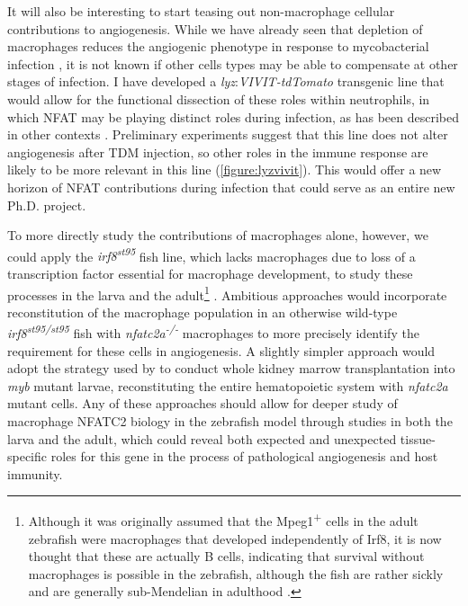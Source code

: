 It will also be interesting to start teasing out non\hyp{}macrophage cellular contributions to angiogenesis. While we have already seen that depletion of macrophages reduces the angiogenic phenotype in response to mycobacterial infection \citep{Oehlers2015}, it is not known if other cells types may be able to compensate at other stages of infection. I have developed a \textit{lyz}:\textit{VIVIT\hyp{}tdTomato} transgenic line that would allow for the functional dissection of these roles within neutrophils, in which NFAT may be playing distinct roles during infection, as has been described in other contexts \citep{Herbst2015, Vymazal2021, Vega2007}. Preliminary experiments suggest that this line does not alter angiogenesis after TDM injection, so other roles in the immune response are likely to be more relevant in this line (\autoref{figure:lyzvivit}). This would offer a new horizon of NFAT contributions during infection that could serve as an entire new Ph.D. project.

To more directly study the contributions of macrophages alone, however, we could apply the \textit{irf8\textsuperscript{st95}} fish line, which lacks macrophages due to loss of a transcription factor essential for macrophage development, to study these processes in the larva and the adult\footnote{Although it was originally assumed that the Mpeg1\textsuperscript{+} cells in the adult zebrafish were macrophages that developed independently of Irf8, it is now thought that these are actually B cells, indicating that survival without macrophages is possible in the zebrafish, although the fish are rather sickly and are generally sub\hyp{}Mendelian in adulthood \citep{Ferrero2020}.} \citep{Shiau2015, Xu2012, Tamura2005}. Ambitious approaches would incorporate reconstitution of the macrophage population in an otherwise wild\hyp{}type \textit{irf8\textsuperscript{st95/st95}} fish with \textit{nfatc2a\textsuperscript{\hyp{}/\hyp{}}} macrophages to more precisely identify the requirement for these cells in angiogenesis. A slightly simpler approach would adopt the strategy used by \citet{Cronan2021} to conduct whole kidney marrow transplantation into \textit{myb} mutant larvae, reconstituting the entire hematopoietic system with \textit{nfatc2a} mutant cells. Any of these approaches should allow for deeper study of macrophage NFATC2 biology in the zebrafish model through studies in both the larva and the adult, which could reveal both expected and unexpected tissue\hyp{}specific roles for this gene in the process of pathological angiogenesis and host immunity.

